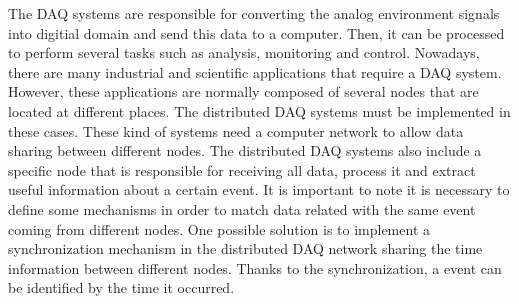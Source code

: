 The DAQ \cite{daq:book1} systems are responsible for converting the analog environment signals into digitial domain and send this data to a computer. Then, it can be processed to perform several tasks such as analysis, monitoring and control. Nowadays, there are many industrial \cite{daq:res} and scientific applications \cite{daq:sensor-networks} that require a DAQ system. However, these applications are normally composed of several nodes that are located at different places. The distributed DAQ systems must be implemented in these cases. These kind of systems need a computer network to allow data sharing between different nodes. The distributed DAQ systems also include a specific node that is responsible for receiving all data, process it and extract useful information about a certain event. It is important to note it is necessary to define some mechanisms in order to match data related with the same event coming from different nodes. One possible solution is to implement a synchronization mechanism in the distributed DAQ network sharing the time information between different nodes. Thanks to the synchronization, a event can be identified by the time it occurred.


